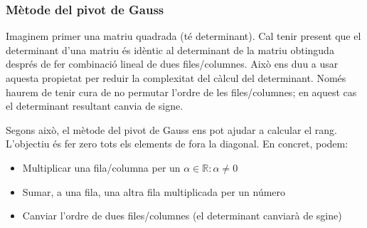 \documentclass{beamer}
\begin{document}
\begin{frame}
  \frametitle{Mètode del pivot de Gauss}
  Imaginem primer una matriu quadrada (té determinant). Cal tenir present que el determinant d'una matriu és idèntic al determinant de la matriu obtinguda després de fer combinació lineal de dues files/columnes. Això ens duu a usar aquesta propietat per reduir la complexitat del càlcul del determinant. Només haurem de tenir cura de no permutar l'ordre de les files/columnes; en aquest cas el determinant resultant canvia de signe.

  Segons això, el mètode del pivot de Gauss ens pot ajudar a calcular el rang. L'objectiu és fer zero tots els elements de fora la diagonal. En concret, podem:
  \begin{itemize}
    \item Multiplicar una fila/columna per un $\alpha \in \mathbb{R}: \alpha \neq 0$
    \item Sumar, a una fila, una altra fila multiplicada per un número
    \item Canviar l'ordre de dues files/columnes (el determinant canviarà de sgine)
  \end{itemize}
\end{frame}
\end{document}
